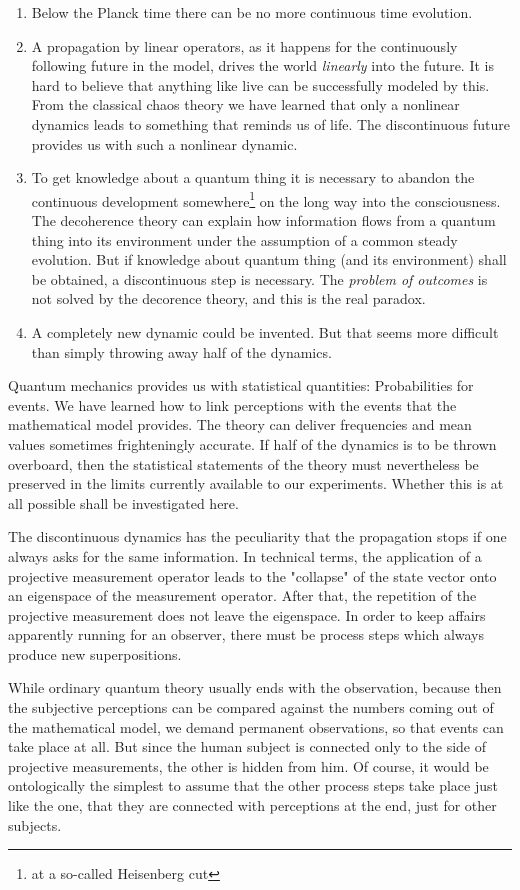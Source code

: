 \documentclass[12pt]{article}
\begin{document}
\begin{enumerate}
    \item Below the Planck time there can be no more continuous time evolution.
    \item A propagation by linear operators, as it happens for the continuously following future in the model, drives the world \emph{linearly} into the future. It is hard to believe that anything like live can be successfully modeled by this. From the classical chaos theory we have learned that only a nonlinear dynamics leads to something that reminds us of life. The discontinuous future provides us with such a nonlinear dynamic.
    \item To get knowledge about a quantum thing it is necessary to abandon the continuous development somewhere\footnote{at a so-called Heisenberg cut} on the long way into the consciousness. The decoherence theory can explain how information flows from a quantum thing into its environment under the assumption of a common steady evolution. But if knowledge about quantum thing (and its environment) shall be obtained, a discontinuous step is necessary. The \emph{problem of outcomes} is not solved by the decorence theory, and this is the real paradox.
    \item A completely new dynamic could be invented. But that seems more difficult than simply throwing away half of the dynamics.
\end{enumerate}
Quantum mechanics provides us with statistical quantities: Probabilities for events. We have learned how to link perceptions with the events that the mathematical model provides. The theory can deliver frequencies and mean values sometimes frighteningly accurate. If half of the dynamics is to be thrown overboard, then the statistical statements of the theory must nevertheless be preserved in the limits currently available to our experiments. Whether this is at all possible shall be investigated here.

The discontinuous dynamics has the peculiarity that the propagation stops if one always asks for the same information. In technical terms, the application of a projective measurement operator leads to the "collapse" of the state vector onto an eigenspace of the measurement operator. After that, the repetition of the projective measurement does not leave the eigenspace. In order to keep affairs apparently running for an observer, there must be process steps which always produce new superpositions.

While ordinary quantum theory usually ends with the observation, because then the subjective perceptions can be compared against the numbers coming out of the mathematical model, we demand permanent observations, so that events can take place at all. But since the human subject is connected only to the side of projective measurements, the other is hidden from him. Of course, it would be ontologically the simplest to assume that the other process steps take place just like the one, that they are connected with perceptions at the end, just for other subjects.
\end{document}
